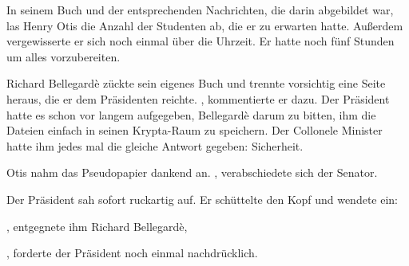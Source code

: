 In seinem Buch und der entsprechenden Nachrichten, die darin abgebildet war, las Henry Otis die Anzahl der Studenten ab, die er zu erwarten hatte. Außerdem vergewisserte er sich noch einmal über die Uhrzeit. Er hatte noch fünf Stunden um alles vorzubereiten.

\par

Richard Bellegardè zückte sein eigenes Buch und trennte vorsichtig eine Seite heraus, die er dem Präsidenten reichte. , kommentierte er dazu. Der Präsident hatte es schon vor langem aufgegeben, Bellegardè darum zu bitten, ihm die Dateien einfach in seinen Krypta-Raum zu speichern. Der Collonele Minister hatte ihm jedes mal die gleiche Antwort gegeben: Sicherheit.

\par

Otis nahm das Pseudopapier dankend an. , verabschiedete sich der Senator.

\par

Der Präsident sah sofort ruckartig auf. Er schüttelte den Kopf und wendete ein: 

\par

, entgegnete ihm Richard  Bellegardè, 

\par

, forderte der Präsident noch einmal nachdrücklich.

\par

